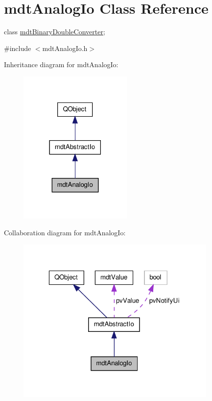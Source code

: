 \hypertarget{classmdt_analog_io}{\section{mdt\-Analog\-Io Class Reference}
\label{classmdt_analog_io}
}


class \hyperlink{classmdt_binary_double_converter}{mdt\-Binary\-Double\-Converter};  




{\ttfamily \#include $<$mdt\-Analog\-Io.\-h$>$}



Inheritance diagram for mdt\-Analog\-Io\-:\nopagebreak
\begin{figure}[H]
\begin{center}
\leavevmode
\includegraphics[width=158pt]{classmdt_analog_io__inherit__graph}
\end{center}
\end{figure}


Collaboration diagram for mdt\-Analog\-Io\-:\nopagebreak
\begin{figure}[H]
\begin{center}
\leavevmode
\includegraphics[width=280pt]{classmdt_analog_io__coll__graph}
\end{center}
\end{figure}
